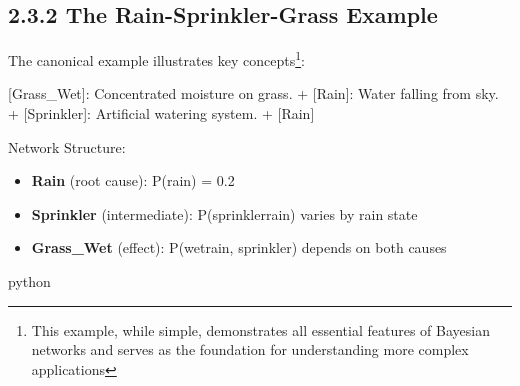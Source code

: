 \documentclass[
  11pt,
  letterpaper,
  openany]{book}
\newenvironment{Shaded}{\begin{snugshade}}{\end{snugshade}}
\newcommand{\CommentTok}[1]{\textcolor[rgb]{0.37,0.37,0.37}{#1}}
\newcommand{\NormalTok}[1]{\textcolor[rgb]{0.00,0.23,0.31}{#1}}
\newcommand{\OtherTok}[1]{\textcolor[rgb]{0.00,0.23,0.31}{#1}}
\newcommand{\SpecialStringTok}[1]{\textcolor[rgb]{0.13,0.47,0.30}{#1}}
\providecommand{\tightlist}{%
  \setlength{\itemsep}{0pt}\setlength{\parskip}{0pt}}
\begin{document}
\subsection{2.3.2 The Rain-Sprinkler-Grass
Example}\label{the-rain-sprinkler-grass-example}

The canonical example illustrates key concepts\footnote{This example,
  while simple, demonstrates all essential features of Bayesian networks
  and serves as the foundation for understanding more complex
  applications}:

\begin{Shaded}
\begin{Highlighting}[]
\OtherTok{[Grass\_Wet]: }\NormalTok{Concentrated moisture on grass. }
\SpecialStringTok{ + }\CommentTok{[}\OtherTok{Rain}\CommentTok{]}\NormalTok{: Water falling from sky.}
\SpecialStringTok{ + }\CommentTok{[}\OtherTok{Sprinkler}\CommentTok{]}\NormalTok{: Artificial watering system.}
\SpecialStringTok{   + }\CommentTok{[}\OtherTok{Rain}\CommentTok{]}
\end{Highlighting}
\end{Shaded}

Network Structure:

\begin{itemize}
\tightlist
\item
  \textbf{Rain} (root cause): P(rain) = 0.2
\item
  \textbf{Sprinkler} (intermediate): P(sprinkler\textbar rain) varies by
  rain state
\item
  \textbf{Grass\_Wet} (effect): P(wet\textbar rain, sprinkler) depends
  on both causes
\end{itemize}

python
\end{document}
